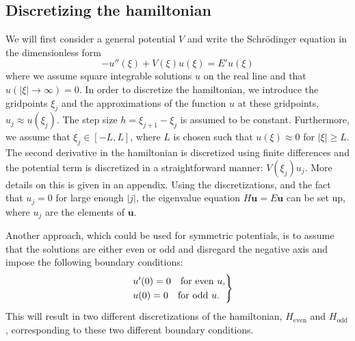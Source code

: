 \documentclass[twocolumn]{article}
\begin{document}
\begin{large}
\subsection*{Discretizing the hamiltonian}
We will first consider a general potential $V$ and write the Schrödinger equation in the dimensionless form
\begin{equation}
    \label{2apr1953}
    -u''(\xi) + V(\xi)u(\xi) = E'u(\xi)
\end{equation}
where we assume square integrable solutions $u$ on the real line and that $u(|\xi|\to\infty) = 0$. In order to discretize the hamiltonian, we introduce the gridpoints $\xi_j$ and the approximations of the function $u$ at these gridpoints, $u_j\approx u(\xi_j)$. The step size $h=\xi_{j+1}-\xi_j$ is assumed to be constant. Furthermore, we assume that $\xi_j\in[-L,L]$, where $L$ is chosen such that $u(\xi)\approx 0$ for $|\xi|\geq L$. The second derivative in the hamiltonian is discretized using finite differences and the potential term is discretized in a straightforward manner: $V(\xi_j)u_j$. More details on this is given in an appendix. Using the discretizations, and the fact that $u_j=0$ for large enough $|j|$, the eigenvalue equation $H\mathbf{u} = E\mathbf{u}$ can be set up, where $u_j$ are the elements of $\mathbf{u}$. 

Another approach, which could be used for symmetric potentials, is to assume that the solutions are either even or odd and disregard the negative axis and impose the following boundary conditions:
\begin{equation}
    \begin{rcases}
        &u'(0) = 0 \quad \text{for even } u, \\ 
        &u(0) = 0  \quad \text{for odd } u.
    \end{rcases}
\end{equation} 
This will result in two different discretizations of the hamiltonian, $H_\text{even}$ and $H_\text{odd}$, corresponding to these two different boundary conditions. 


\end{large}
\end{document}
